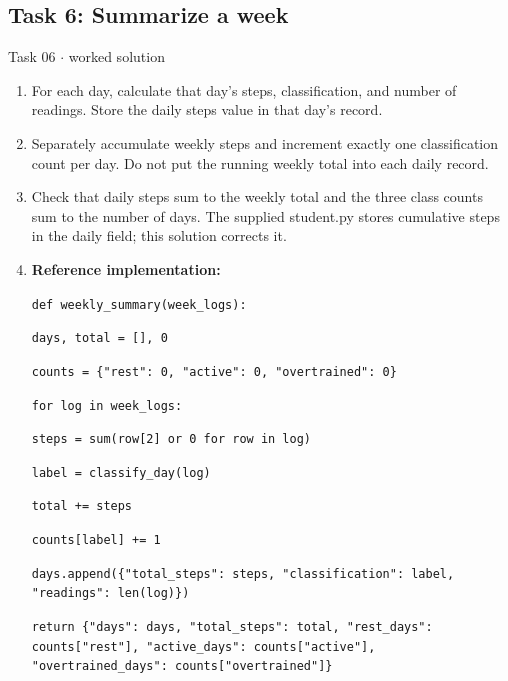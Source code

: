 \documentclass[11pt]{article}
\begin{document}
\begin{keepsection}\subsection{Task 6: Summarize a week}

\begin{workedbox}{Task 06 \ensuremath{\cdot} worked solution}
\begin{enumerate}
\item For each day, calculate that day’s steps, classification, and number of readings. Store the daily steps value in that day’s record.
\item Separately accumulate weekly steps and increment exactly one classification count per day. Do not put the running weekly total into each daily record.
\item Check that daily steps sum to the weekly total and the three class counts sum to the number of days. The supplied student.py stores cumulative steps in the daily field; this solution corrects it.
\item {}
\textbf{Reference implementation:}
\begin{tcolorbox}[colback=Paperblue,colframe=Paperblue,boxrule=0pt,arc=0pt,left=7pt,right=7pt,top=5pt,bottom=5pt]\small\sloppy
\noindent\hspace*{0em}\texttt{def weekly\_summary(week\_logs):}\par
\noindent\hspace*{1em}\texttt{days, total = [], 0}\par
\noindent\hspace*{1em}\texttt{counts = \{"rest": 0, "active": 0, "overtrained": 0\}}\par
\noindent\hspace*{1em}\texttt{for log in week\_logs:}\par
\noindent\hspace*{3em}\texttt{steps = sum(row[2] or 0 for row in log)}\par
\noindent\hspace*{3em}\texttt{label = classify\_day(log)}\par
\noindent\hspace*{3em}\texttt{total += steps}\par
\noindent\hspace*{3em}\texttt{counts[label] += 1}\par
\noindent\hspace*{3em}\texttt{days.append(\{"total\_steps": steps, "classification": label, "readings": len(log)\})}\par
\noindent\hspace*{1em}\texttt{return \{"days": days, "total\_steps": total, "rest\_days": counts["rest"], "active\_days": counts["active"], "overtrained\_days": counts["overtrained"]\}}\par
\end{tcolorbox}
\end{enumerate}
\end{workedbox}

\end{keepsection}
\end{document}
